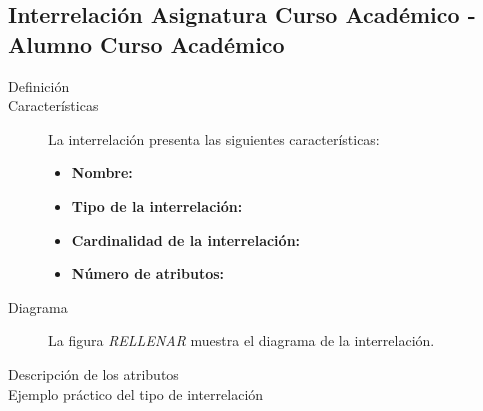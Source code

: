 \subsection{Interrelación Asignatura Curso Académico - Alumno Curso Académico}

   \begin{description}
      \item[Definición]

      \item[Características] La interrelación presenta las siguientes
                             características:

         \begin{itemize}
            \item \textbf{Nombre:}
            \item \textbf{Tipo de la interrelación:}
            \item \textbf{Cardinalidad de la interrelación:}
            \item \textbf{Número de atributos:}
         \end{itemize}

      \item[Diagrama] La figura \textit{RELLENAR} muestra el diagrama de la
                      interrelación.

      \item[Descripción de los atributos]

      \item[Ejemplo práctico del tipo de interrelación]
   \end{description}
